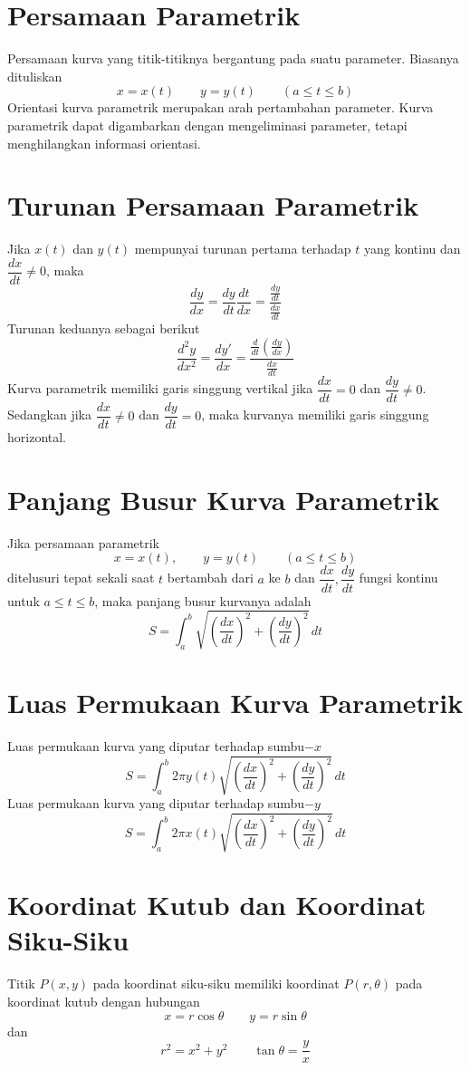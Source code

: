 \documentclass{article}
\begin{document}
\section{Persamaan Parametrik}
Persamaan kurva yang titik-titiknya bergantung pada suatu parameter. Biasanya dituliskan
$$ x=x(t) \qquad y=y(t) \qquad (a\leq t\leq b)$$
Orientasi kurva parametrik merupakan arah pertambahan parameter.
Kurva parametrik dapat digambarkan dengan mengeliminasi parameter, tetapi menghilangkan informasi orientasi.
\section{Turunan Persamaan Parametrik}
Jika $x(t)$ dan $y(t)$ mempunyai turunan pertama terhadap $t$ yang kontinu dan $\dfrac{dx}{dt}\neq 0$, maka
$$ \dfrac{dy}{dx} = \dfrac{dy}{dt}\dfrac{dt}{dx} = \dfrac{\frac{dy}{dt}}{\frac{dx}{dt}} $$
Turunan keduanya sebagai berikut
$$ \dfrac{d^2y}{dx^2} = \dfrac{dy'}{dx} = \dfrac{\frac{d}{dt}\left(\frac{dy}{dx}\right)}{\frac{dx}{dt}} $$
Kurva parametrik memiliki garis singgung vertikal jika $\dfrac{dx}{dt}=0$ dan $\dfrac{dy}{dt}\neq 0$. Sedangkan jika $\dfrac{dx}{dt}\neq 0$ dan $\dfrac{dy}{dt}=0$, maka kurvanya memiliki garis singgung horizontal.
\section{Panjang Busur Kurva Parametrik}
Jika persamaan parametrik 
$$ x=x(t),\qquad y=y(t)\qquad (a\leq t\leq b) $$
ditelusuri tepat sekali saat $t$ bertambah dari $a$ ke $b$ dan $\dfrac{dx}{dt},\dfrac{dy}{dt}$ fungsi kontinu untuk $a\leq t\leq b$, maka panjang busur kurvanya adalah 
$$ S=\int_a^b \sqrt{\left(\dfrac{dx}{dt}\right)^2+\left(\dfrac{dy}{dt}\right)^2} \, dt $$
\section{Luas Permukaan Kurva Parametrik}
Luas permukaan kurva yang diputar terhadap sumbu$-x$
$$ S=\int_a^b 2\pi y(t)\sqrt{\left(\dfrac{dx}{dt}\right)^2+\left(\dfrac{dy}{dt}\right)^2} \, dt $$
Luas permukaan kurva yang diputar terhadap sumbu$-y$
$$ S=\int_a^b 2\pi x(t)\sqrt{\left(\dfrac{dx}{dt}\right)^2+\left(\dfrac{dy}{dt}\right)^2} \, dt $$
\section{Koordinat Kutub dan Koordinat Siku-Siku}
Titik $P(x,y)$ pada koordinat siku-siku memiliki koordinat $P(r,\theta)$ pada koordinat kutub dengan hubungan
$$ x=r\cos \theta \qquad y=r\sin\theta $$
dan 
$$ r^2=x^2+y^2\qquad \tan \theta =\dfrac{y}{x} $$
\end{document}
